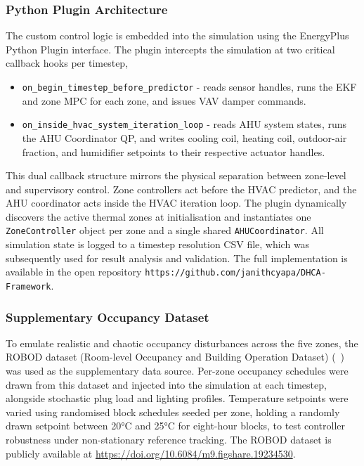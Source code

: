 \documentclass[12pt, a4paper]{article}
\begin{document}
	\subsubsection{Python Plugin Architecture}
	
	The custom control logic is embedded into the simulation using the EnergyPlus Python Plugin interface. The plugin intercepts the simulation at two critical callback hooks per timestep,
	
	\begin{itemize}
		\item \texttt{on\_begin\_timestep\_before\_predictor} - reads sensor handles, runs the EKF and zone MPC for each zone, and issues VAV damper commands.
		\item \texttt{on\_inside\_hvac\_system\_iteration\_loop} - reads AHU system states, runs the AHU Coordinator QP, and writes cooling coil, heating coil, outdoor-air fraction, and humidifier setpoints to their respective actuator handles.
	\end{itemize}
	
	This dual callback structure mirrors the physical separation between zone-level and supervisory control. Zone controllers act before the HVAC predictor, and the AHU coordinator acts inside the HVAC iteration loop. The plugin dynamically discovers the active thermal zones at initialisation and instantiates one \texttt{ZoneController} object per zone and a single shared \texttt{AHUCoordinator}. All simulation state is logged to a timestep resolution CSV file, which was subsequently used for result analysis and validation. The full implementation is available in the open repository \texttt{https://github.com/janithcyapa/DHCA-Framework}.
	
	\subsubsection{Supplementary Occupancy Dataset}
	
	To emulate realistic and chaotic occupancy disturbances across the five zones, the ROBOD dataset (Room-level Occupancy and Building Operation Dataset) (~\cite{robod2022}) was used as the supplementary data source. Per-zone occupancy schedules were drawn from this dataset and injected into the simulation at each timestep, alongside stochastic plug load and lighting profiles. Temperature setpoints were varied using randomised block schedules seeded per zone, holding a randomly drawn setpoint between 20°C and 25°C for eight-hour blocks, to test controller robustness under non-stationary reference tracking. The ROBOD dataset is publicly available at \url{https://doi.org/10.6084/m9.figshare.19234530}.
	
\end{document}
